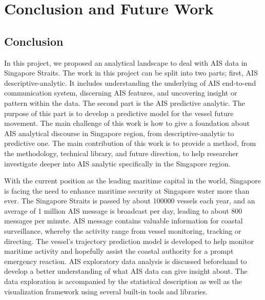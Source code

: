 \chapter{Conclusion and Future Work}
\label{ch:concl}

\section{Conclusion}
In this project, we proposed an analytical landscape to deal with AIS data in Singapore Straits. The work in this project can be split into two parts; first, AIS descriptive-analytic. It includes understanding the underlying of AIS end-to-end communication system, discerning AIS features, and uncovering insight or pattern within the data. The second part is the AIS predictive analytic. The purpose of this part is to develop a predictive model for the vessel future movement. The main challenge of this work is how to give a foundation about AIS analytical discourse in Singapore region, from descriptive-analytic to predictive one. The main contribution of this work is to provide a method, from the methodology, technical library, and future direction, to help researcher investigate deeper into AIS analytic specifically in the Singapore region.

With the current position as the leading maritime capital in the world, Singapore is facing the need to enhance maritime security at Singapore water more than ever. The Singapore Straits is passed by about 100000 vessels each year, and an average of 1 million AIS message is broadcast per day, leading to about 800 messages per minute. AIS message contains valuable information for coastal surveillance, whereby the activity range from vessel monitoring, tracking or directing. The vessel's trajectory prediction model is developed to help monitor maritime activity and hopefully assist the coastal authority for a prompt emergency reaction. AIS exploratory data analysis is discussed beforehand to develop a better understanding of what AIS data can give insight about. The data exploration is accompanied by the statistical description as well as the visualization framework using several built-in tools and libraries.

